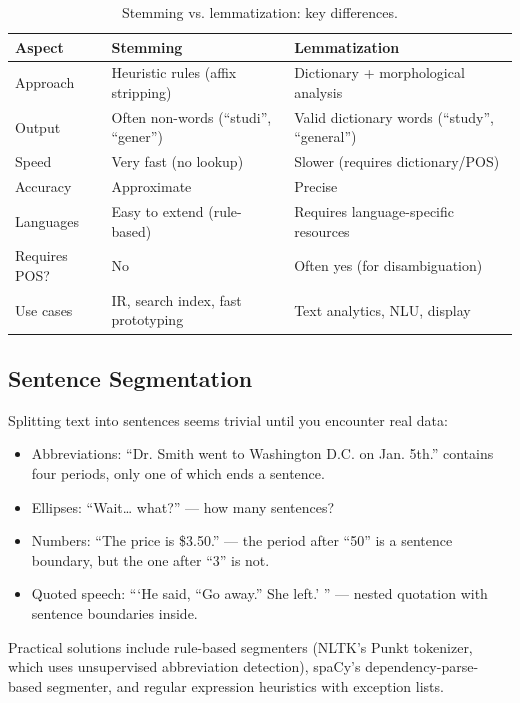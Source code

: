 \begin{table}[H]
\centering
\caption{Stemming vs. lemmatization: key differences.}
\label{tab:stem_vs_lemma}
\begin{tabular}{@{}lll@{}}
\toprule
\textbf{Aspect} & \textbf{Stemming} & \textbf{Lemmatization} \\
\midrule
Approach & Heuristic rules (affix stripping) & Dictionary + morphological analysis \\
Output & Often non-words (``studi'', ``gener'') & Valid dictionary words (``study'', ``general'') \\
Speed & Very fast (no lookup) & Slower (requires dictionary/POS) \\
Accuracy & Approximate & Precise \\
Languages & Easy to extend (rule-based) & Requires language-specific resources \\
Requires POS? & No & Often yes (for disambiguation) \\
Use cases & IR, search index, fast prototyping & Text analytics, NLU, display \\
\bottomrule
\end{tabular}
\end{table}

\subsection{Sentence Segmentation}
\label{sec:sentence_seg}

Splitting text into sentences seems trivial until you encounter real data:

\begin{itemize}
    \item Abbreviations: ``Dr. Smith went to Washington D.C. on Jan. 5th.'' contains four
    periods, only one of which ends a sentence.
    \item Ellipses: ``Wait\ldots{} what?'' --- how many sentences?
    \item Numbers: ``The price is \$3.50.'' --- the period after ``50'' is a sentence
    boundary, but the one after ``3'' is not.
    \item Quoted speech: ```He said, ``Go away.'' She left.' '' --- nested quotation with
    sentence boundaries inside.
\end{itemize}

Practical solutions include rule-based segmenters (NLTK's Punkt tokenizer, which uses
unsupervised abbreviation detection), spaCy's dependency-parse-based segmenter, and
regular expression heuristics with exception lists.

